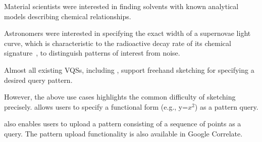   \item Material scientists were interested in finding solvents with known analytical models describing chemical relationships.
  \item Astronomers were interested in specifying the exact width of a supernovae light curve, which is characteristic to the radioactive decay rate of its chemical signature~\cite{Nugent1997}, to distinguish patterns of interest from noise.
\enumend
\featurelist
\item Almost all existing VQSs, including \zvpp, support freehand sketching for specifying a desired query pattern. %
\item However, the above use cases highlights the common difficulty of sketching precisely. \zvpp allows users to specify a functional form (e.g., y=$x^2$) as a pattern query.
\item \zvpp also enables users to upload a pattern consisting of a sequence of points as a query. The pattern upload functionality is also available in Google Correlate.
\enumend
